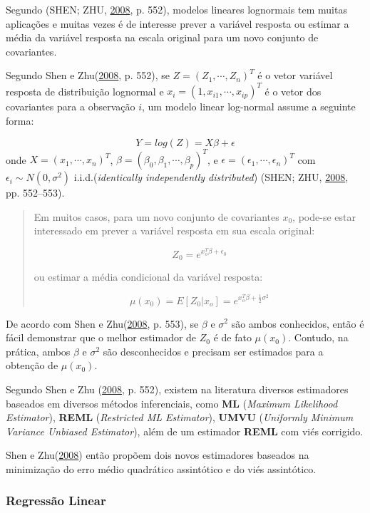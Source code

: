 \documentclass[a4paper]{article}
\begin{document}
Segundo (SHEN; ZHU, \protect\hyperlink{ref-shen}{2008}, p. 552), modelos
lineares lognormais tem muitas aplicações e muitas vezes é de interesse
prever a variável resposta ou estimar a média da variável resposta na
escala original para um novo conjunto de covariantes.

Segundo Shen e Zhu(\protect\hyperlink{ref-shen}{2008}, p. 552), se
\(Z = (Z_1,\cdots, Z_n)^T\) é o vetor variável resposta de distribuição
lognormal e \(x_i = (1, x_{i1}, \cdots, x_{ip})^T\) é o vetor dos
covariantes para a observação \(i\), um modelo linear log-normal assume
a seguinte forma:

\[Y = log(Z) = X\beta + \epsilon\] onde \(X = (x_1, \cdots, x_n)^T\),
\(\beta = (\beta_0, \beta_1, \cdots, \beta_p)^T\), e
\(\epsilon = (\epsilon_1, \cdots, \epsilon_n)^T\) com
\(\epsilon_i \sim N(0, \sigma^2)\) i.i.d.(\emph{identically
independently distributed}) (SHEN; ZHU,
\protect\hyperlink{ref-shen}{2008}, pp. 552--553).

\begin{quote}
Em muitos casos, para um novo conjunto de covariantes \(x_0\), pode-se
estar interessado em prever a variável resposta em sua escala original:

\[Z_0 = e^{x_o^T\beta + \epsilon_0}\]

ou estimar a média condicional da variável resposta:

\[\mu(x_0)=E[Z_0|x_o] = e^{x_o^T\beta + \frac{1}{2}\sigma^2}\]
\end{quote}

De acordo com Shen e Zhu(\protect\hyperlink{ref-shen}{2008}, p. 553), se
\(\beta\) e \(\sigma^2\) são ambos conhecidos, então é fácil demonstrar
que o melhor estimador de \(Z_0\) é de fato \(\mu(x_0)\). Contudo, na
prática, ambos \(\beta\) e \(\sigma^2\) são desconhecidos e precisam ser
estimados para a obtenção de \(\mu(x_0)\).

Segundo Shen e Zhu (\protect\hyperlink{ref-shen}{2008}, p. 552), existem
na literatura diversos estimadores baseados em diversos métodos
inferenciais, como \textbf{ML} (\emph{Maximum Likelihood Estimator}),
\textbf{REML} (\emph{Restricted ML Estimator}), \textbf{UMVU}
(\emph{Uniformly Minimum Variance Unbiased Estimator}), além de um
estimador \textbf{REML} com viés corrigido.

Shen e Zhu(\protect\hyperlink{ref-shen}{2008}) então propõem dois novos
estimadores baseados na minimização do erro médio quadrático assintótico
e do viés assintótico.

\subsubsection{Regressão Linear}\label{regressao-linear-1}
\end{document}

